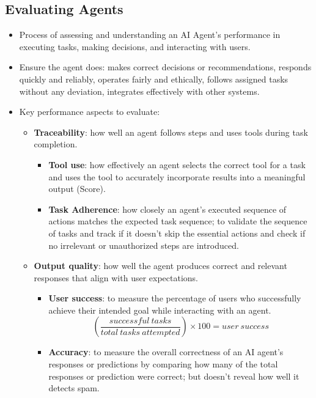\documentclass[12pt, letterpaper]{article}
\begin{document}
\subsection{Evaluating Agents}
\begin{itemize}
    \item Process of assessing and understanding an AI Agent's performance in executing tasks, making decisions, and interacting with users.
    \item Ensure the agent does: makes correct decisions or recommendations, responds quickly and reliably, operates fairly and ethically, follows assigned tasks without any deviation, integrates effectively with other systems.
    \item Key performance aspects to evaluate:
        \begin{itemize}
            \item \textbf{Traceability}: how well an agent follows steps and uses tools during task completion.
                \begin{itemize}
                    \item \textbf{Tool use}: how effectively an agent selects the correct tool for a task and uses the tool to accurately incorporate results into a meaningful output (Score).
                    \item \textbf{Task Adherence}: how closely an agent's executed sequence of actions matches the expected task sequence; to validate the sequence of tasks and track if it doesn't skip the essential actions and check if no irrelevant or unauthorized steps are introduced.
                \end{itemize}
            \item \textbf{Output quality}: how well the agent produces correct and relevant responses that align with user expectations.
                \begin{itemize}
                    \item \textbf{User success}: to measure the percentage of users who successfully achieve their intended goal while interacting with an agent.
                        \begin{equation}
                            (\frac{successful \ tasks}{total \ tasks \ attempted}) \times 100 = user \ success
                        \end{equation}
                    \item \textbf{Accuracy}: to measure the overall correctness of an AI agent's responses or predictions by comparing how many of the total responses or prediction were correct; but doesn't reveal how well it detects spam.

\end{itemize}
\end{itemize}
\end{itemize}
\end{document}
